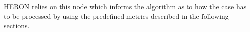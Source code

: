 HERON relies on this  node which informs the algorithm as to how the case has to be processed by using the predefined metrics described in the following sections.
